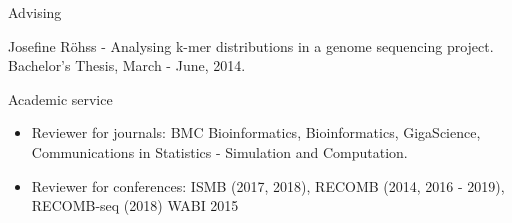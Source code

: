 \documentclass{resume} %
\begin{document}
\begin{rSection}{Advising}
\item Josefine R{\"o}hss - Analysing k-mer distributions in a genome sequencing project. Bachelor's Thesis, March - June, 2014.
\end{rSection}







\begin{rSection}{Academic service}

\begin{itemize}
\item Reviewer for journals: BMC Bioinformatics, Bioinformatics, GigaScience, Communications in Statistics - Simulation and Computation.
\end{itemize}

\begin{itemize}
\item Reviewer for conferences: ISMB (2017, 2018), RECOMB (2014, 2016 - 2019), RECOMB-seq (2018) WABI 2015 
\end{itemize}

\end{rSection}


%
\end{document}
